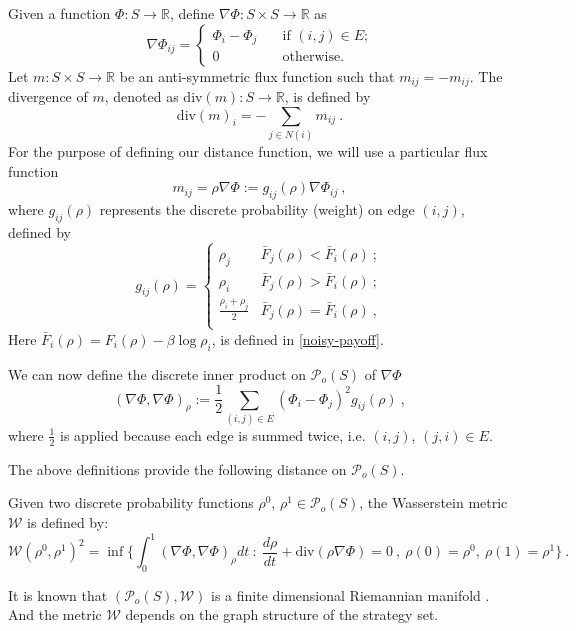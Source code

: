 \documentclass[11pt,reqno]{amsart}
\begin{document}
Given a function $\Phi\colon S\to \mathbb{R}$, define
$\nabla\Phi\colon S\times S\to \mathbb{R}$ as
\begin{equation*}
\nabla\Phi_{ij}=\begin{cases} \Phi_i-\Phi_j\quad &\textrm{if $(i,j)\in E$;}\\
0\quad &\textrm{otherwise}.
\end{cases}
\end{equation*} 
Let $m\colon S\times S\to \mathbb{R}$ be an anti-symmetric flux function such that $m_{ij} = -m_{ij}$. The divergence of $m$, denoted as $\textrm{div}(m)\colon S\rightarrow \mathbb{R}$, is defined by \begin{equation*}
\textrm{div}(m)_i = -\sum_{j\in N(i)}m_{ij}\ .
\end{equation*}
For the purpose of defining our distance function, we will use a particular flux function
\begin{equation*}
m_{ij}=\rho \nabla\Phi:=g_{ij}(\rho)\nabla\Phi_{ij}\ ,
\end{equation*}
where $g_{ij}(\rho)$ represents the discrete probability (weight) on $\mathrm{edge}$ $(i,j)$, defined by 
\begin{equation*}
g_{ij}(\rho)=
\begin{cases}
\rho_j & \bar F_j(\rho)<\bar F_i(\rho)\ ;\\
\rho_i& \bar F_j(\rho)>\bar F_i(\rho)\ ;\\
\frac{\rho_i+\rho_j}{2}& \bar F_j(\rho)=\bar F_i(\rho)\ ,\\
\end{cases}
\end{equation*}
Here $\bar F_i(\rho)=F_i(\rho)-\beta\log\rho_i$, is defined in \eqref{noisy-payoff}.

We can now define the discrete inner product on $\mathcal{P}_o(S)$ of $\nabla\Phi$ 
\begin{equation*}
(\nabla\Phi,\nabla\Phi )_\rho:=\frac{1}{2}\sum_{(i,j)\in E} (\Phi_i-\Phi_j)^2g_{ij}(\rho)\ ,
\end{equation*}
where $\frac{1}{2}$ is applied because each edge is summed twice, i.e. $(i,j)$, $(j, i)\in E$.

The above definitions provide the following distance on $\mathcal{P}_o(S)$. 
\begin{definition}
Given two discrete probability functions $\rho^0$, $ \rho^1\in\mathcal{P}_o(S)$, the Wasserstein metric $\mathcal{W}$ is defined by:
\begin{equation*}\label{metric}
\mathcal{W}(\rho^0,\rho^1)^2=\inf \{\int_0^1(\nabla\Phi,\nabla\Phi)_\rho dt~:~ \frac{d\rho}{dt}+\mathrm{div}(\rho\nabla\Phi)=0\ ,~\rho(0)=\rho^0,~\rho(1)=\rho^1\}\ .
\end{equation*}
\end{definition}
It is known that $(\mathcal{P}_o(S), \mathcal{W})$ is a finite dimensional Riemannian manifold \cite{chow2012, maas2011gradient}. And the metric $\mathcal{W}$ depends on the graph structure of the strategy set.
\end{document}
